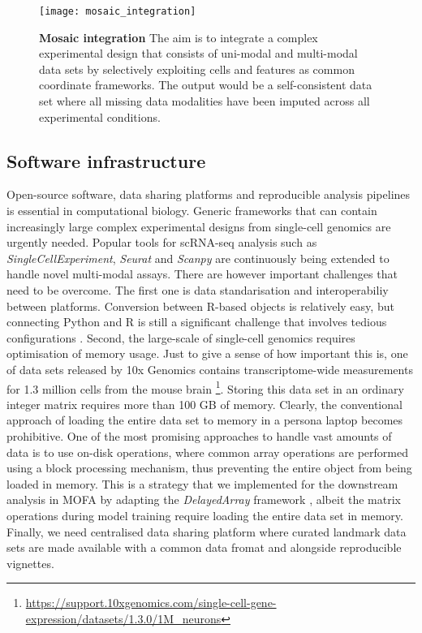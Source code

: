\begin{figure}[H]
	\centering
	\texttt{[image: mosaic\_integration]}
	\caption[]{
	\textbf{Mosaic integration} The aim is to integrate a complex experimental design that consists of uni-modal and multi-modal data sets by selectively exploiting cells and features as common coordinate frameworks. The output would be a self-consistent data set where all missing data modalities have been imputed across all experimental conditions.}
	\label{fig:mosaic_integration}
\end{figure}


\subsection{Software infrastructure} 

Open-source software, data sharing platforms and reproducible analysis pipelines is essential in computational biology. Generic frameworks that can contain increasingly large complex experimental designs from single-cell genomics are urgently needed. Popular tools for scRNA-seq analysis such as \textit{SingleCellExperiment}, \textit{Seurat} and \textit{Scanpy} are continuously being extended to handle novel multi-modal assays. There are however important challenges that need to be overcome. The first one is data standarisation and interoperabiliy between platforms. Conversion between R-based objects is relatively easy, but connecting Python and R is still a significant challenge that involves tedious configurations \cite{reticulate}. Second, the large-scale of single-cell genomics requires optimisation of memory usage. Just to give a sense of how important this is, one of data sets released by 10x Genomics contains transcriptome-wide measurements for 1.3 million cells from the mouse brain \footnote{\url{https://support.10xgenomics.com/single-cell-gene-expression/datasets/1.3.0/1M_neurons}}. Storing this data set in an ordinary integer matrix requires more than 100 GB of memory. Clearly, the conventional approach of loading the entire data set to memory in a persona laptop becomes prohibitive. One of the most promising approaches to handle vast amounts of data is to use on-disk operations, where common array operations are performed using a block processing mechanism, thus preventing the entire object from being loaded in memory. This is a strategy that we implemented for the downstream analysis in MOFA by adapting the \textit{DelayedArray} framework \cite{Herve2020}, albeit the matrix operations during model training require loading the entire data set in memory. Finally, we need centralised data sharing platform where curated landmark data sets are made available with a common data fromat and alongside reproducible vignettes. 

